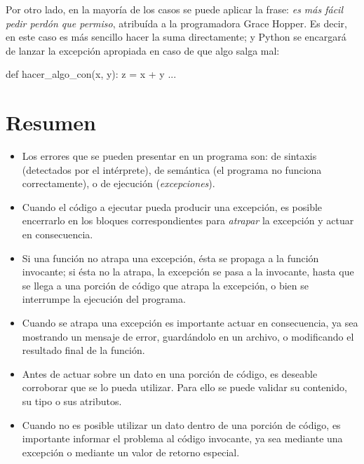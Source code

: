Por otro lado, en la mayoría de los casos se puede aplicar la frase: {\it
es más fácil pedir perdón que permiso}, atribuída a la programadora Grace
Hopper. Es decir, en este caso es más sencillo hacer la suma directamente; y
Python se encargará de lanzar la excepción apropiada en caso de que algo salga
mal:

\begin{codigo-python-sn}
def hacer_algo_con(x, y):
    z = x + y
    ...
\end{codigo-python-sn}

\section{Resumen}

\begin{itemize}
\item Los errores que se pueden presentar en un programa son: de sintaxis
(detectados por el intérprete), de semántica (el programa no funciona
correctamente), o de ejecución ({\it excepciones}).
\item Cuando el código a ejecutar pueda producir una excepción, es posible
encerrarlo en los bloques correspondientes para {\it atrapar} la excepción y
actuar en consecuencia.
\item Si una función no atrapa una excepción, ésta se propaga a la
función invocante; si ésta no la atrapa, la excepción se pasa a la
invocante, hasta que se llega a una porción de código que atrapa la
excepción, o bien se interrumpe la ejecución del programa.
\item Cuando se atrapa una excepción es importante actuar en consecuencia,
ya sea mostrando un mensaje de error, guardándolo en un archivo, o
modificando el resultado final de la función.
\item Antes de actuar sobre un dato en una porción de código, es deseable
corroborar que se lo pueda utilizar. Para ello se puede validar su contenido,
su tipo o sus atributos.
\item Cuando no es posible utilizar un dato dentro de una porción de
código, es importante informar el problema al código invocante, ya sea
mediante una excepción o mediante un valor de retorno especial.
\end{itemize}

